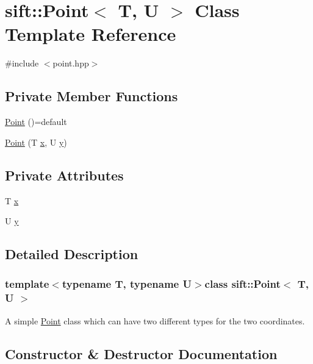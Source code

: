 \hypertarget{classsift_1_1Point}{}\section{sift\+:\+:Point$<$ T, U $>$ Class Template Reference}
\label{classsift_1_1Point}


{\ttfamily \#include $<$point.\+hpp$>$}

\subsection*{Private Member Functions}
\begin{DoxyCompactItemize}
\item 
\hyperlink{classsift_1_1Point_a0d825e35d3b47cae1f9e348852629865}{Point} ()=default
\item 
\hyperlink{classsift_1_1Point_a4b3f2e85080df4c4cc23fa9801347078}{Point} (T \hyperlink{classsift_1_1Point_a2750289ec97eb4de425ffc5550f7c8ac}{x}, U \hyperlink{classsift_1_1Point_a8aceeaa688cd89aef1967fd96df3699d}{y})
\end{DoxyCompactItemize}
\subsection*{Private Attributes}
\begin{DoxyCompactItemize}
\item 
T \hyperlink{classsift_1_1Point_a2750289ec97eb4de425ffc5550f7c8ac}{x}
\item 
U \hyperlink{classsift_1_1Point_a8aceeaa688cd89aef1967fd96df3699d}{y}
\end{DoxyCompactItemize}


\subsection{Detailed Description}
\subsubsection*{template$<$typename T, typename U$>$class sift\+::\+Point$<$ T, U $>$}

A simple \hyperlink{classsift_1_1Point}{Point} class which can have two different types for the two coordinates. 

\subsection{Constructor \& Destructor Documentation}
\hypertarget{classsift_1_1Point_a0d825e35d3b47cae1f9e348852629865}{}
